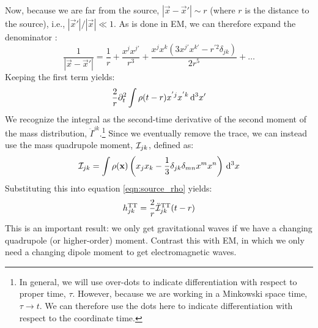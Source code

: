 Now, because we are far from the source, $|\vec{x} - \vec{x}'| \sim r$ (where $r$ is the distance to the source), i.e., $|\vec{x}'|/|\vec{x}| \ll 1$. As is done in \ac{EM}, we can therefore expand the denominator \cite{BlanfordThorne}:
\begin{equation}
\label{eqn:expansion}
\frac{1}{|\vec{x} - \vec{x}'|} = \frac{1}{r} + \frac{x^{j}x^{j'}}{r^3} + \frac{x^j x^k (3x^{j'}x^{k'} - r^{'2}\delta_{jk})}{2r^5} + \ldots
\end{equation}
Keeping the first term yields:
\begin{equation*}
\frac{2}{r} \partial_t^2 \int \rho(t - r) x^{'j}x^{'k} \,\mathrm{d}^3 x'
\end{equation*}
We recognize the integral as the second-time derivative of the second moment of the mass distribution, $\ddot{I}^{jk}$.\footnote{In general, we will use over-dots to indicate differentiation with respect to proper time, $\tau$. However, because we are working in a Minkowski space time, $\tau \rightarrow t$. We can therefore use the dots here to indicate differentiation with respect to the coordinate time.} Since we eventually remove the trace, we can instead use the mass quadrupole moment, $\mathcal{I}_{jk}$, defined as:
\begin{equation}
\label{eqn:quad_moment}
\qI_{jk} = \int \rho(\mathbf{x})\left( x_j x_k - \frac{1}{3} \delta_{jk} \delta_{mn} x^{m} x^{n} \right) \d^3 x
\end{equation}
Substituting this into equation \ref{eqn:source_rho} yields:
\begin{equation}
\label{eqn:h_mass_quad}
h^{\TT}_{jk} = \frac{2}{r} \ddot{\qI}_{jk}^\TT(t - r)
\end{equation}
This is an important result: we only get gravitational waves if we have a changing quadrupole (or higher-order) moment. Contrast this with \ac{EM}, in which we only need a changing dipole moment to get electromagnetic waves.

